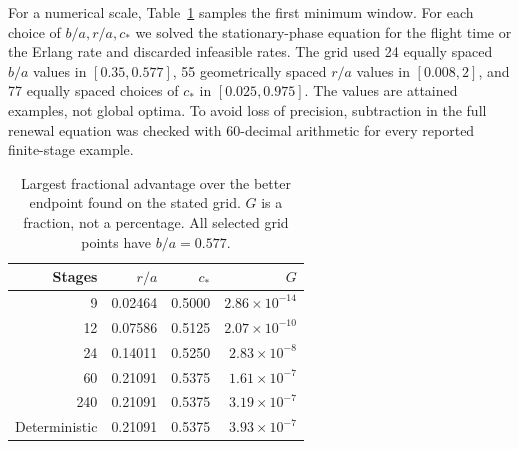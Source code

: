 For a numerical scale, Table~\ref{tab:gains} samples the first minimum window. For each choice of $b/a,r/a,c_*$ we solved the stationary-phase equation for the flight time or the Erlang rate and discarded infeasible rates. The grid used 24 equally spaced $b/a$ values in $[0.35,0.577]$, 55 geometrically spaced $r/a$ values in $[0.008,2]$, and 77 equally spaced choices of $c_*$ in $[0.025,0.975]$. The values are attained examples, not global optima. To avoid loss of precision, subtraction in the full renewal equation was checked with 60-decimal arithmetic for every reported finite-stage example.

\begin{table}[ht]\centering
\caption{Largest fractional advantage over the better endpoint found on the stated grid. $G$ is a fraction, not a percentage. All selected grid points have $b/a=0.577$.}\label{tab:gains}
\begin{tabular}{rrrr}
Stages & $r/a$ & $c_*$ & $G$\\\hline
9 & 0.02464 & 0.5000 & $2.86\times10^{-14}$\\
12 & 0.07586 & 0.5125 & $2.07\times10^{-10}$\\
24 & 0.14011 & 0.5250 & $2.83\times10^{-8}$\\
60 & 0.21091 & 0.5375 & $1.61\times10^{-7}$\\
240 & 0.21091 & 0.5375 & $3.19\times10^{-7}$\\
Deterministic & 0.21091 & 0.5375 & $3.93\times10^{-7}$
\end{tabular}
\end{table}
